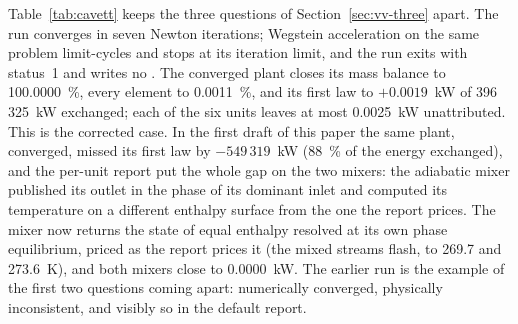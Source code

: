 \documentclass[preprint,12pt]{elsarticle}
\newcommand{\code}[1]{\texttt{\detokenize{#1}}}
\begin{document}
Table~\ref{tab:cavett} keeps the three questions of
Section~\ref{sec:vv-three} apart.  The run converges in seven Newton
iterations; Wegstein acceleration on the same problem limit-cycles and stops
at its iteration limit, and the run exits with status~1 and writes no
\code{converged/}.  The converged plant closes its mass balance to
100.0000~\%, every element to 0.0011~\%, and its first law to $+0.0019$~kW
of 396\,325~kW exchanged; each of the six units leaves at most 0.0025~kW
unattributed.  This is the corrected case.  In the first draft of this
paper the same plant, converged, missed its first law by $-549\,319$~kW
(88~\% of the energy exchanged), and the per-unit report put the whole gap
on the two mixers: the adiabatic mixer published its outlet in the phase
of its dominant inlet and computed its temperature on a different
enthalpy surface from the one the report prices.  The mixer now returns the
state of equal enthalpy resolved at its own phase equilibrium, priced as
the report prices it (the mixed streams flash, to 269.7 and 273.6~K), and
both mixers close to 0.0000~kW.  The earlier run is the example of the
first two questions coming apart: numerically converged, physically
inconsistent, and visibly so in the default report.
\end{document}
